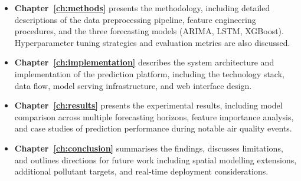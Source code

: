 \begin{itemize}
    \item \textbf{Chapter~\ref{ch:methods}} presents the methodology, including detailed descriptions of the data preprocessing pipeline, feature engineering procedures, and the three forecasting models (ARIMA, LSTM, XGBoost). Hyperparameter tuning strategies and evaluation metrics are also discussed.
    
    \item \textbf{Chapter~\ref{ch:implementation}} describes the system architecture and implementation of the prediction platform, including the technology stack, data flow, model serving infrastructure, and web interface design.
    
    \item \textbf{Chapter~\ref{ch:results}} presents the experimental results, including model comparison across multiple forecasting horizons, feature importance analysis, and case studies of prediction performance during notable air quality events.
    
    \item \textbf{Chapter~\ref{ch:conclusion}} summarises the findings, discusses limitations, and outlines directions for future work including spatial modelling extensions, additional pollutant targets, and real-time deployment considerations.
\end{itemize}
